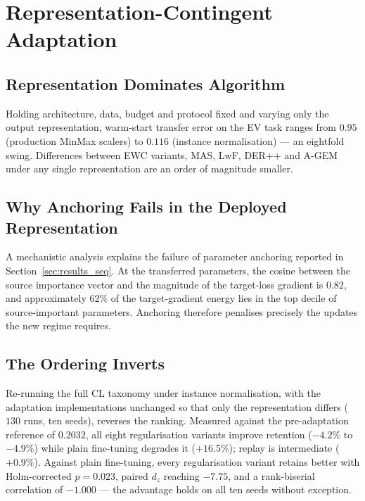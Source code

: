 \documentclass[journal]{IEEEtran}
\begin{document}
\section{Representation-Contingent Adaptation}
\label{sec:repr}


\subsection{Representation Dominates Algorithm}
Holding architecture, data, budget and protocol fixed and varying only the
output representation, warm-start transfer error on the EV task ranges from
$0.95$ (production MinMax scalers) to $0.116$ (instance normalisation) --- an
eightfold swing. Differences between EWC variants, MAS, LwF, DER++ and A-GEM
under any single representation are an order of magnitude smaller.

\subsection{Why Anchoring Fails in the Deployed Representation}
A mechanistic analysis explains the failure of parameter anchoring reported in
Section~\ref{sec:results_seq}. At the transferred parameters, the cosine between
the source importance vector and the magnitude of the target-loss gradient is
$0.82$, and approximately $62\%$ of the target-gradient energy lies in the top
decile of source-important parameters. Anchoring therefore penalises precisely
the updates the new regime requires.

\subsection{The Ordering Inverts}
Re-running the full CL taxonomy under instance normalisation, with the
adaptation implementations unchanged so that only the representation differs
($130$ runs, ten seeds), reverses the ranking. Measured against the
pre-adaptation reference of $0.2032$, all eight regularisation variants improve
retention ($-4.2\%$ to $-4.9\%$) while plain fine-tuning degrades it
($+16.5\%$); replay is intermediate ($+0.9\%$). Against plain fine-tuning, every
regularisation variant retains better with Holm-corrected $p{=}0.023$, paired
$d_z$ reaching $-7.75$, and a rank-biserial correlation of $-1.000$ --- the
advantage holds on all ten seeds without exception.
\end{document}
